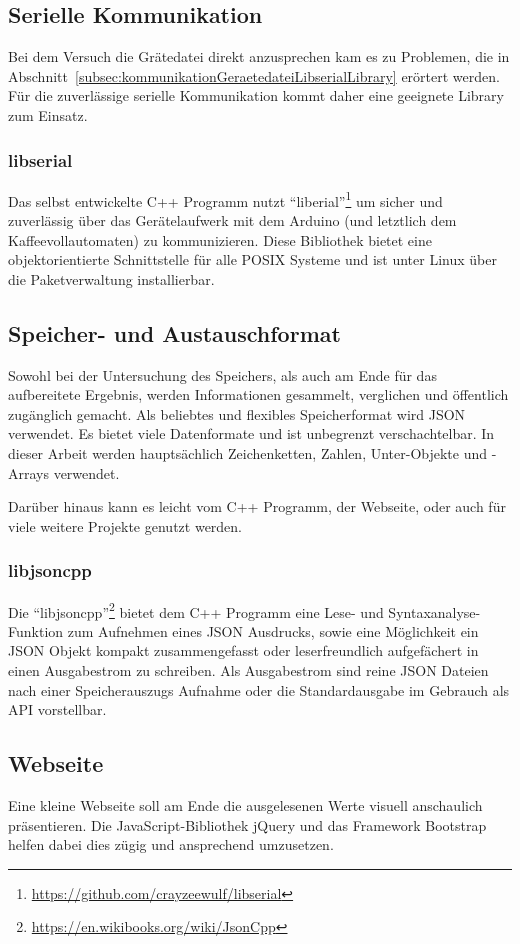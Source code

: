 \subsection{Serielle Kommunikation}
Bei dem Versuch die Grätedatei direkt anzusprechen kam es zu Problemen, die in Abschnitt~\ref{subsec:kommunikationGeraetedateiLibserialLibrary} erörtert werden. Für die zuverlässige serielle Kommunikation kommt daher eine geeignete Library zum Einsatz.

\subsubsection{libserial}
Das selbst entwickelte C++ Programm nutzt "`liberial"'\footnote{\url{https://github.com/crayzeewulf/libserial}} um sicher und zuverlässig über das Gerätelaufwerk mit dem Arduino (und letztlich dem Kaffeevollautomaten) zu kommunizieren.
Diese Bibliothek bietet eine objektorientierte Schnittstelle für alle \ac{POSIX} Systeme und ist unter Linux über die Paketverwaltung installierbar.

\subsection{Speicher- und Austauschformat}
Sowohl bei der Untersuchung des Speichers, als auch am Ende für das aufbereitete Ergebnis, werden Informationen gesammelt, verglichen und öffentlich zugänglich gemacht.
Als beliebtes und flexibles Speicherformat wird \ac{JSON} verwendet.
Es bietet viele Datenformate und ist unbegrenzt verschachtelbar.
In dieser Arbeit werden hauptsächlich Zeichenketten, Zahlen, Unter-Objekte und -Arrays verwendet.

Darüber hinaus kann es leicht vom C++ Programm, der Webseite, oder auch für viele weitere Projekte genutzt werden.

\subsubsection{libjsoncpp}
Die "`libjsoncpp"'\footnote{\url{https://en.wikibooks.org/wiki/JsonCpp}} bietet dem C++ Programm eine Lese- und Syntaxanalyse-Funktion zum Aufnehmen eines \ac{JSON} Ausdrucks, sowie eine Möglichkeit ein \ac{JSON} Objekt kompakt zusammengefasst oder leserfreundlich aufgefächert in einen Ausgabestrom zu schreiben.
Als Ausgabestrom sind reine \ac{JSON} Dateien nach einer Speicherauszugs Aufnahme oder die Standardausgabe im Gebrauch als API vorstellbar.


\subsection{Webseite}
Eine kleine Webseite soll am Ende die ausgelesenen Werte visuell anschaulich präsentieren.
Die JavaScript-Bibliothek jQuery und das Framework Bootstrap helfen dabei dies zügig und ansprechend umzusetzen.

